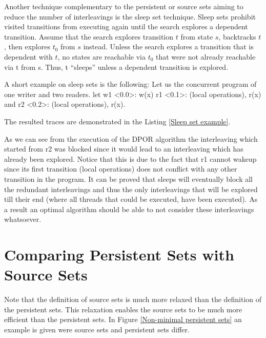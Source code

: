Another technique complementary to the persistent or source sets aiming to reduce the number of interleavings is the sleep set technique.
Sleep sets prohibit visited transitions from executing again
until the search explores a dependent transition. Assume that
the search explores transition $t$ from state $s$, backtracks $t$,
then explores $t_0$ from $s$ instead. Unless the search explores
a transition that is dependent with $t$, no states are reachable
via $t_0$ that were not already reachable via t from s. Thus, t
“sleeps” unless a dependent transition is explored.

A short example on sleep sets is the following:
Let us the concurrent program of one writer and two readers.
let w1 <0.0>: w(x) r1 <0.1>: (local operations), r(x) and r2 <0.2>: (local operations), r(x).

The resulted traces are demonstrated in the Listing \ref{Sleep set example}.


As we can see from the execution of the DPOR algorithm the interleaving which started from r2 was blocked since it would lead to an interleaving which
has already been explored. Notice that this is due to the fact that r1 cannot wakeup since its first transition (local operations) does not conflict with any other transition
in the program. 
It can be proved \cite{Godefroid1996} that sleeps will eventually block all the redundant interleavings and thus the only interleavings that will be explored till their end (where all threads that could be executed, have been executed).
As a result an optimal algorithm should be able to not consider these interleavings whatsoever.

\section{Comparing Persistent Sets with Source Sets}

Note that the definition of source sets is much more relaxed than the definition of the persistent sets. 
This relaxation enables the source sets to be much more efficient than the persistent sets. In Figure \ref{Non-minimal persistent sets}
an example is given were source sets and persistent sets differ.

